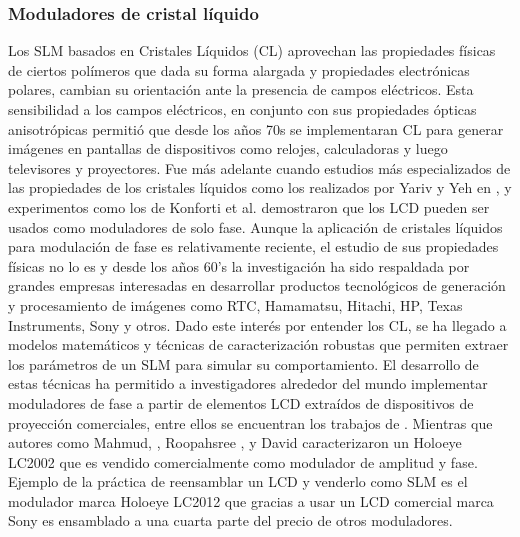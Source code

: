 \subsubsection{Moduladores de cristal líquido}
Los SLM basados en Cristales Líquidos (CL) aprovechan las propiedades
físicas de ciertos polímeros que dada su forma alargada y propiedades
electrónicas polares, cambian su orientación ante la presencia de
campos eléctricos.  Esta sensibilidad a los campos eléctricos, en
conjunto con sus propiedades ópticas anisotrópicas permitió que desde
los años 70s se implementaran CL para generar imágenes en pantallas de
dispositivos como relojes, calculadoras y luego televisores y
proyectores. Fue más adelante cuando estudios más especializados de las
propiedades de los cristales líquidos como los realizados por Yariv y Yeh
en \cite{Yeh1999,Yariv2002}, y experimentos como los de Konforti et
al. \cite{Konforti1988} demostraron que los LCD pueden ser usados como
moduladores de solo fase. 
Aunque la aplicación de cristales líquidos para modulación de fase es
relativamente reciente, el estudio de sus propiedades físicas no lo es
y desde los años 60’s la investigación ha sido respaldada por grandes
empresas interesadas en desarrollar productos tecnológicos de
generación y procesamiento de imágenes como RTC, Hamamatsu, Hitachi, HP, Texas
Instruments, Sony y otros. Dado este interés por entender los CL, se
ha llegado a modelos matemáticos y  técnicas de  
caracterización robustas que permiten extraer los parámetros de un SLM para
 simular su comportamiento.
El desarrollo de estas técnicas ha permitido a investigadores 
alrededor del mundo implementar moduladores de fase a
partir de elementos LCD extraídos de dispositivos de proyección
comerciales, entre ellos se encuentran los trabajos de
\cite{Pezzaniti1993,Soutar1994,Zhang1994,Moreno1998,Davis1999,Iemmi2001,Davis2003,Moreno2003,Kim2005,Duran2006,Duran2007,Marquez2007,Liu2010,Ma2010,Ma2011,Yu2012}. Mientras
que autores como Mahmud, \cite{Mahmud2008}, Roopahsree
\cite{Roopashree2009a}, y David \cite{Dev2012}
caracterizaron un Holoeye LC2002 que es vendido comercialmente como
modulador de amplitud y fase.
Ejemplo de la práctica de reensamblar un LCD y venderlo como SLM es el
modulador marca Holoeye LC2012 que gracias a usar un LCD comercial
marca Sony es ensamblado a una cuarta parte del precio de otros
moduladores. 

